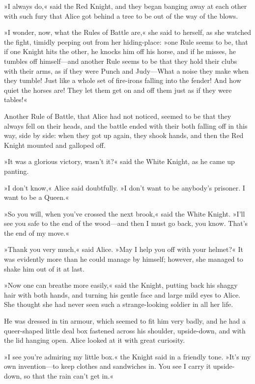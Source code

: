 »I always do,« said the Red Knight, and they began banging away at each other with such fury that Alice got behind a tree to be out of the way of the blows.

»I wonder, now, what the Rules of Battle are,« she said to herself, as she watched the fight, timidly peeping out from her hiding-place: »one Rule seems to be, that if one Knight hits the other, he knocks him off his horse, and if he misses, he tumbles off himself—and another Rule seems to be that they hold their clubs with their arms, as if they were Punch and Judy—What a noise they make when they tumble! Just like a whole set of fire-irons falling into the fender! And how quiet the horses are! They let them get on and off them just as if they were tables!«

Another Rule of Battle, that Alice had not noticed, seemed to be that they always fell on their heads, and the battle ended with their both falling off in this way, side by side: when they got up again, they shook hands, and then the Red Knight mounted and galloped off.

\label{white7}
\label{black6}

»It was a glorious victory, wasn't it?« said the White Knight, as he came up panting.

»I don't know,« Alice said doubtfully. »I don't want to be anybody's prisoner. I want to be a Queen.«

»So you will, when you've crossed the next brook,« said the White Knight. »I'll see you safe to the end of the wood—and then I must go back, you know. That's the end of my move.«

»Thank you very much,« said Alice. »May I help you off with your helmet?« It was evidently more than he could manage by himself; however, she managed to shake him out of it at last.

»Now one can breathe more easily,« said the Knight, putting back his shaggy hair with both hands, and turning his gentle face and large mild eyes to Alice. She thought she had never seen such a strange-looking soldier in all her life.

He was dressed in tin armour, which seemed to fit him very badly, and he had a queer-shaped little deal box fastened across his shoulder, upside-down, and with the lid hanging open. Alice looked at it with great curiosity.

»I see you're admiring my little box.« the Knight said in a friendly tone. »It's my own invention—to keep clothes and sandwiches in. You see I carry it upside-down, so that the rain can't get in.«


